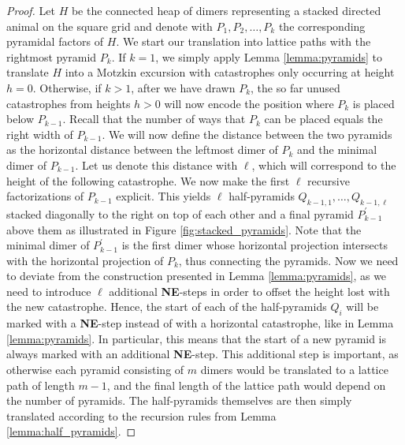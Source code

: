 \begin{proof}
Let $H$ be the connected heap of dimers representing a stacked directed animal on the square grid and denote with $P_1,P_2,\dots,P_k$ the corresponding pyramidal factors of $H$. We start our translation into lattice paths with the rightmost pyramid $P_k$. If $k = 1$, we simply apply Lemma \ref{lemma:pyramids} to translate $H$ into a Motzkin excursion with catastrophes only occurring at height $h = 0$.
Otherwise, if $k > 1$, after we have drawn $P_k$,
the so far unused catastrophes from heights $h > 0$ will now encode the position where $P_k$ is placed below $P_{k-1}$. 
Recall that the number of ways that $P_k$ can be placed equals the right width of $P_{k-1}$. 
We will now define the distance between the two pyramids as the horizontal distance between the leftmost dimer of $P_k$ and the minimal dimer of $P_{k-1}$. Let us denote this distance with $\ell$, which will correspond to the height of the following catastrophe. 
We now make the first $\ell$ recursive factorizations of $P_{k-1}$ explicit. This yields $\ell$ half-pyramids $Q_{k-1,1},\dots,Q_{k-1,\ell}$ stacked diagonally to the right on top of each other and a final pyramid $P_{k-1}^\prime$ above them as illustrated in Figure \ref{fig:stacked_pyramids}. Note that the minimal dimer of $P_{k-1}^\prime$ is the first dimer whose horizontal projection intersects with the horizontal projection of $P_k$, thus connecting the pyramids.
Now we need to deviate from the construction presented in Lemma \ref{lemma:pyramids}, as we need to introduce $\ell$ additional \textbf{NE}-steps in order to offset the height lost with the new catastrophe. 
Hence, the start of each of the half-pyramids $Q_i$ will be marked with a \textbf{NE}-step instead of with a horizontal catastrophe, like in Lemma \ref{lemma:pyramids}. 
In particular, this means that the start of a new pyramid is always marked with an additional \textbf{NE}-step. 
This additional step is important, as otherwise each pyramid consisting of $m$ dimers would be translated to a lattice path of length $m - 1$, and the final length of the lattice path would depend on the number of pyramids.
The half-pyramids themselves are then simply translated according to the recursion rules from Lemma \ref{lemma:half_pyramids}. 

\end{proof}
